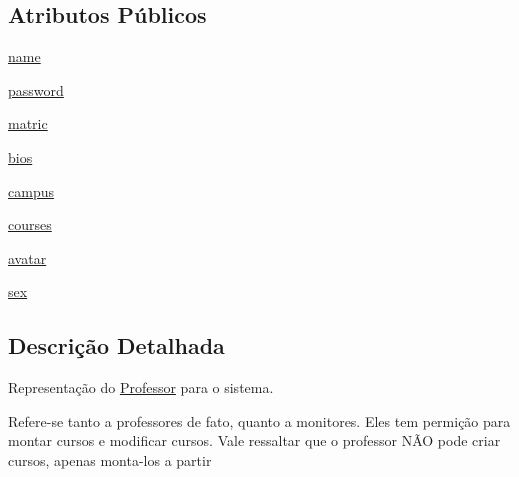 \subsection*{Atributos Públicos}
\begin{DoxyCompactItemize}
\item 
\hyperlink{classELO_1_1EntityUnit_1_1Professor_ae85cc0fc9c64a277111a85e87efbe049}{name}
\item 
\hyperlink{classELO_1_1EntityUnit_1_1Professor_af0810854479e9f9a806eb6bfe7468e60}{password}
\item 
\hyperlink{classELO_1_1EntityUnit_1_1Professor_afc64d3f1b0e7c88530c7ee62f67ef671}{matric}
\item 
\hyperlink{classELO_1_1EntityUnit_1_1Professor_a2e403e0bfc353dcdf9988140d61d5ca7}{bios}
\item 
\hyperlink{classELO_1_1EntityUnit_1_1Professor_ad95cfc8959dcb02a6afff422703d4dde}{campus}
\item 
\hyperlink{classELO_1_1EntityUnit_1_1Professor_a6eb0d2789bb8750fb275aca0f8bb74bb}{courses}
\item 
\hyperlink{classELO_1_1EntityUnit_1_1Professor_a593a0636e87dcdd9ced2e6b7494a45dc}{avatar}
\item 
\hyperlink{classELO_1_1EntityUnit_1_1Professor_ac049dc360c4af27037158e33577288e1}{sex}
\end{DoxyCompactItemize}


\subsection{Descrição Detalhada}
Representação do \hyperlink{classELO_1_1EntityUnit_1_1Professor}{Professor} para o sistema. 

Refere-\/se tanto a professores de fato, quanto a monitores. Eles tem permição para montar cursos e modificar cursos. Vale ressaltar que o professor NÃ\-O pode criar cursos, apenas monta-\/los a partir 

